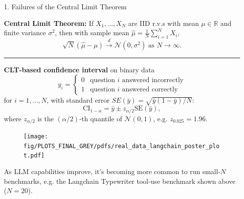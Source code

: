 \documentclass[final]{beamer}
\newlength{\sepwidth}
\newlength{\colwidth}
\newcommand{\separatorcolumn}{\begin{column}{\sepwidth}\end{column}}
\begin{document}
\begin{frame}[fragile]
\begin{columns}[t]
\separatorcolumn

\begin{column}{\colwidth}

  \begin{exampleblock}{1. Failures of the Central Limit Theorem}

    \textbf{Central Limit Theorem:}
    If $X_1, \ldots, X_N$ are IID r.v.s with mean $\mu \in \mathbb{R}$ and finite variance $\sigma^2$, then with sample mean $\hat{\mu} = \frac{1}{N}\sum_{i=1}^N X_i$,
    $$\sqrt{N} (\hat{\mu} - \mu) \xrightarrow{d} \mathcal{N} \left( 0, \sigma^2 \right) \; \text{as } N \rightarrow \infty.$$

    \begin{center}
      \rule{0.8\textwidth}{0.4pt}
    \end{center}

    \textbf{CLT-based confidence interval} on binary data 
    $$ y_i = \begin{cases} 0 & \text{question } i \text{ answered incorrectly} \\ 1 & \text{question } i \text{ answered correctly} \end{cases} $$
    for $i=1,\ldots,N$, with standard error $SE(\bar{y}) = \sqrt{\bar{y}(1-\bar{y})/N}$:
    $$
    \text{CI}_{1-\alpha} = \bar{y} \pm z_{\alpha/2} \text{SE}(\bar{y}),
    $$
    where $z_{\alpha/2}$ is the $(\alpha/2)$-th quantile of $\mathcal{N}(0, 1)$, e.g. $z_{0.025} = 1.96$.%

    \begin{figure}
      \centering
      \texttt{[image: fig/PLOTS\_FINAL\_GREY/pdfs/real\_data\_langchain\_poster\_plot.pdf]}
    \end{figure}

    As LLM capabilities improve, it's becoming more common to run small-$N$ benchmarks, e.g. the Langchain Typewriter tool-use benchmark shown above ($N=20$).
    

\end{exampleblock}
\end{column}
\end{columns}
\end{frame}
\end{document}
